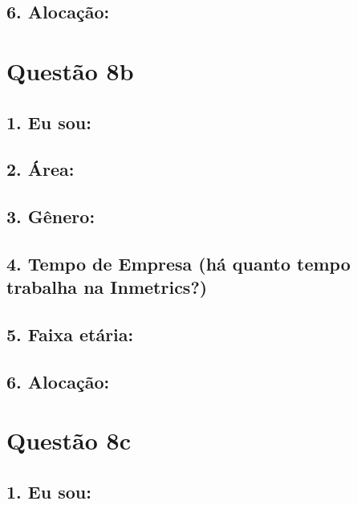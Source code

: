 \documentclass[]{book}
\begin{document}
\hypertarget{alocacao}{%
\subsection{6. Alocação:}\label{alocacao}}

\hypertarget{questao-8b}{%
\section{Questão 8b}\label{questao-8b}}

\hypertarget{eu-sou-1}{%
\subsection{1. Eu sou:}\label{eu-sou-1}}

\hypertarget{area-1}{%
\subsection{2. Área:}\label{area-1}}

\hypertarget{genero-1}{%
\subsection{3. Gênero:}\label{genero-1}}

\hypertarget{tempo-de-empresa-ha-quanto-tempo-trabalha-na-inmetrics-1}{%
\subsection{4. Tempo de Empresa (há quanto tempo trabalha na Inmetrics?)}\label{tempo-de-empresa-ha-quanto-tempo-trabalha-na-inmetrics-1}}

\hypertarget{faixa-etaria-1}{%
\subsection{5. Faixa etária:}\label{faixa-etaria-1}}

\hypertarget{alocacao-1}{%
\subsection{6. Alocação:}\label{alocacao-1}}

\hypertarget{questao-8c}{%
\section{Questão 8c}\label{questao-8c}}

\hypertarget{eu-sou-2}{%
\subsection{1. Eu sou:}\label{eu-sou-2}}
\end{document}
